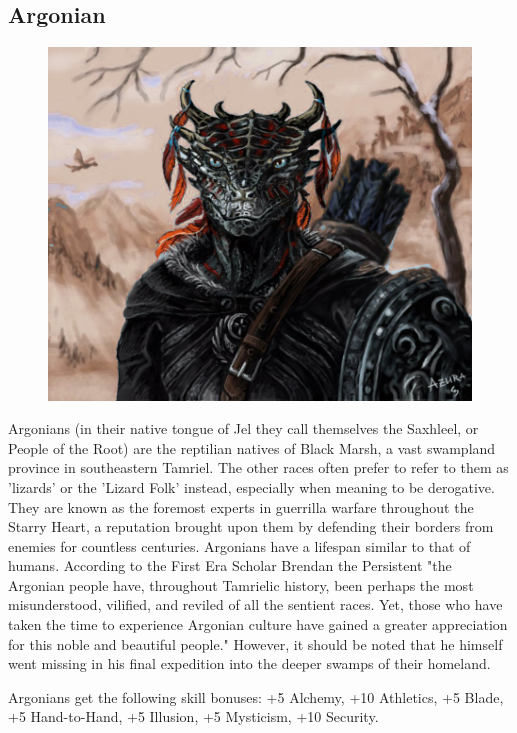 \documentclass[12pt]{book}
\begin{document}
\subsection{Argonian}
\begin{figure}
	\includegraphics[width=\textwidth]{Argonian.png}
\end{figure}

Argonians (in their native tongue of Jel they call themselves the Saxhleel, or People of the Root) are the reptilian natives of Black Marsh, a vast swampland province in southeastern Tamriel. The other races often prefer to refer to them as 'lizards' or the 'Lizard Folk' instead, especially when meaning to be derogative. They are known as the foremost experts in guerrilla warfare throughout the Starry Heart, a reputation brought upon them by defending their borders from enemies for countless centuries. Argonians have a lifespan similar to that of humans. According to the First Era Scholar Brendan the Persistent "the Argonian people have, throughout Tamrielic history, been perhaps the most misunderstood, vilified, and reviled of all the sentient races. Yet, those who have taken the time to experience Argonian culture have gained a greater appreciation for this noble and beautiful people." However, it should be noted that he himself went missing in his final expedition into the deeper swamps of their homeland.

Argonians get the following skill bonuses: +5 Alchemy, +10 Athletics, +5 Blade, +5 Hand-to-Hand, +5 Illusion, +5 Mysticism, +10 Security.
\end{document}
